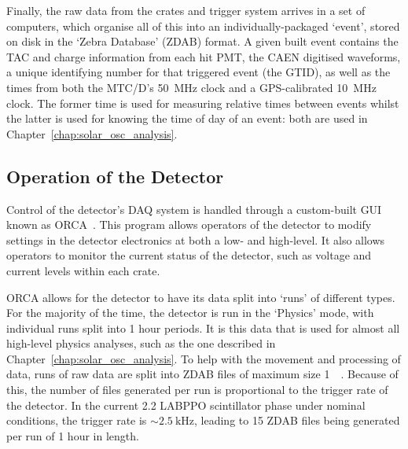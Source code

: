 Finally, the raw data from the crates and trigger system arrives in a set of computers, which organise all of this into an individually-packaged `event', stored on disk in the `Zebra Database' (ZDAB) format. A given built event contains the TAC and charge information from each hit PMT, the CAEN digitised waveforms, a unique identifying number for that triggered event (the GTID), as well as the times from both the MTC/D's \SI{50}{\MHz} clock and a GPS-calibrated \SI{10}{\MHz} clock. The former time is used for measuring relative times between events whilst the latter is used for knowing the time of day of an event: both are used in Chapter~\ref{chap:solar_osc_analysis}.


\subsection{Operation of the Detector}\label{sec:detector_ops}
Control of the detector's DAQ system is handled through a custom-built GUI known as ORCA~\cite{howeSudburyNeutrinoObservatory2004}. %
This program allows operators of the detector to modify settings in the detector electronics at both a low- and high-level. It also allows operators to monitor the current status of the detector, such as voltage and current levels within each crate.

ORCA allows for the detector to have its data split into `runs' of different types. For the majority of the time, the detector is run in the `Physics' mode, with individual runs split into 1 hour periods. It is this data that is used for almost all high-level physics analyses, such as the one described in Chapter~\ref{chap:solar_osc_analysis}. To help with the movement and processing of data, runs of raw data are split into ZDAB files of maximum size \SI{1}{\giga\byte}. Because of this, the number of files generated per run is proportional to the trigger rate of the detector. In the current \SI{2.2}{\gpl} LABPPO scintillator phase under nominal conditions, the trigger rate is $\sim\SI{2.5}{\kilo\Hz}$, leading to 15 ZDAB files being generated per run of 1 hour in length.

